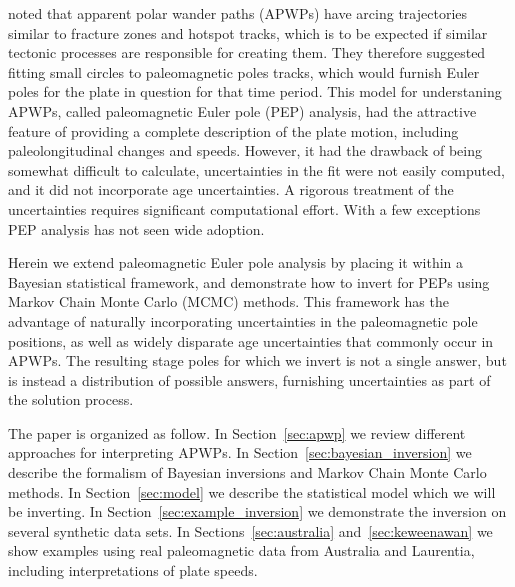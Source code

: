 \documentclass[preprint,12pt,authoryear]{elsarticle}
\begin{document}
\citet{gordon1984paleomagnetic} noted that apparent polar wander paths (APWPs) have 
arcing trajectories similar to fracture zones and hotspot tracks, which is
to be expected if similar tectonic processes are responsible for creating them.
They therefore suggested fitting small circles to paleomagnetic poles tracks,
which would furnish Euler poles for the plate in question for that time period.
This model for understaning APWPs, called paleomagnetic Euler pole (PEP) analysis,
 had the attractive feature of providing a complete description of the plate motion, 
including paleolongitudinal changes and speeds. 
However, it had the drawback of being somewhat difficult to calculate,
uncertainties in the fit were not easily computed, 
and it did not incorporate age uncertainties. 
A rigorous treatment of the uncertainties requires significant computational effort.
With a few exceptions \citep{beck1989paleomagnetism, tarling1996palaeomagnetic, bryan1986rotation, beck2003absolute, smirnov2010co} 
PEP analysis has not seen wide adoption.

Herein we extend paleomagnetic Euler pole analysis by placing it within
a Bayesian statistical framework, and demonstrate how to invert for PEPs
using Markov Chain Monte Carlo (MCMC) methods. This framework has the advantage
of naturally incorporating uncertainties in the paleomagnetic pole positions,
as well as widely disparate age uncertainties that commonly occur in APWPs.
The resulting stage poles for which we invert is not a single answer, but is instead
a distribution of possible answers, furnishing uncertainties as part of the solution process.

The paper is organized as follow. In Section~\ref{sec:apwp} we review different
approaches for interpreting APWPs. In Section~\ref{sec:bayesian_inversion} we
describe the formalism of Bayesian inversions and Markov Chain Monte Carlo methods.
In Section~\ref{sec:model} we describe the statistical model which we will be inverting.
In Section~\ref{sec:example_inversion} we demonstrate the inversion on several
synthetic data sets. In Sections~\ref{sec:australia} and~\ref{sec:keweenawan}
we show examples using real paleomagnetic data from Australia and Laurentia,
including interpretations of plate speeds.
\end{document}
